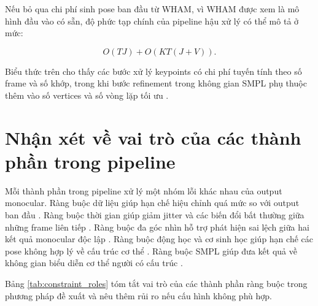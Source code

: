 \documentclass[../DoAn.tex]{subfiles}
\begin{document}
Nếu bỏ qua chi phí sinh pose ban đầu từ WHAM, vì WHAM được xem là mô hình đầu vào có sẵn, độ phức tạp chính của pipeline hậu xử lý có thể mô tả ở mức:

\begin{equation}
O(TJ) + O(KT(J+V)).
\end{equation}

Biểu thức trên cho thấy các bước xử lý keypoints có chi phí tuyến tính theo số frame và số khớp, trong khi bước refinement trong không gian SMPL phụ thuộc thêm vào số vertices và số vòng lặp tối ưu \cite{smpl2015,smplify2016,yang2025learnable}.

\section{Nhận xét về vai trò của các thành phần trong pipeline}

Mỗi thành phần trong pipeline xử lý một nhóm lỗi khác nhau của output monocular. Ràng buộc dữ liệu giúp hạn chế hiệu chỉnh quá mức so với output ban đầu \cite{smplify2016,shin2024wham}. Ràng buộc thời gian giúp giảm jitter và các biến đổi bất thường giữa những frame liên tiếp \cite{physcap2020}. Ràng buộc đa góc nhìn hỗ trợ phát hiện sai lệch giữa hai kết quả monocular độc lập \cite{gu2024multiview,probtriangulation2023}. Ràng buộc động học và cơ sinh học giúp hạn chế các pose không hợp lý về cấu trúc cơ thể \cite{delp2007opensim,uhlrich2023opencap,physcap2020}. Ràng buộc SMPL giúp đưa kết quả về không gian biểu diễn cơ thể người có cấu trúc \cite{smpl2015,smplify2016}.

Bảng \ref{tab:constraint_roles} tóm tắt vai trò của các thành phần ràng buộc trong phương pháp đề xuất và nêu thêm rủi ro nếu cấu hình không phù hợp.
\end{document}
